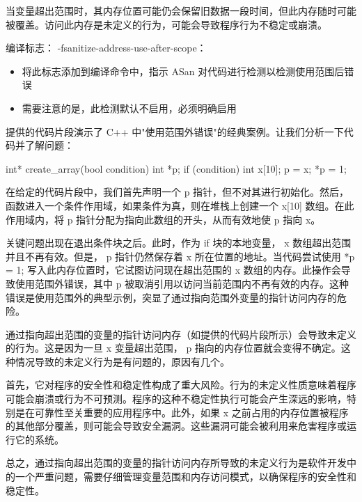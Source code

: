 当变量超出范围时，其内存位置可能仍会保留旧数据一段时间，但此内存随时可能被覆盖。访问此内存是未定义的行为，可能会导致程序行为不稳定或崩溃。


编译标志： -fsanitize-address-use-after-scope：

\begin{itemize}
\item
将此标志添加到编译命令中，指示 ASan 对代码进行检测以检测使用范围后错误

\item
需要注意的是，此检测默认不启用，必须明确启用
\end{itemize}


提供的代码片段演示了 C++ 中"使用范围外错误"的经典案例。让我们分析一下代码并了解问题：

\begin{cpp}
int* create_array(bool condition) {
    int *p;
    if (condition) {
        int x[10];
        p = x;
    }
    *p = 1;
}
\end{cpp}

在给定的代码片段中，我们首先声明一个 p 指针，但不对其进行初始化。然后，函数进入一个条件作用域，如果条件为真，则在堆栈上创建一个 x[10] 数组。在此作用域内，将 p 指针分配为指向此数组的开头，从而有效地使 p 指向 x。

关键问题出现在退出条件块之后。此时，作为 if 块的本地变量， x 数组超出范围并且不再有效。但是， p 指针仍然保存着 x 所在位置的地址。当代码尝试使用 *p = 1; 写入此内存位置时，它试图访问现在超出范围的 x 数组的内存。此操作会导致使用范围外错误，其中 p 被取消引用以访问当前范围内不再有效的内存。这种错误是使用范围外的典型示例，突显了通过指向范围外变量的指针访问内存的危险。

通过指向超出范围的变量的指针访问内存（如提供的代码片段所示）会导致未定义的行为。这是因为一旦 x 变量超出范围， p 指向的内存位置就会变得不确定。这种情况导致的未定义行为是有问题的，原因有几个。

首先，它对程序的安全性和稳定性构成了重大风险。行为的未定义性质意味着程序可能会崩溃或行为不可预测。程序的这种不稳定性执行可能会产生深远的影响，特别是在可靠性至关重要的应用程序中。此外，如果 x 之前占用的内存位置被程序的其他部分覆盖，则可能会导致安全漏洞。这些漏洞可能会被利用来危害程序或运行它的系统。

总之，通过指向超出范围的变量的指针访问内存所导致的未定义行为是软件开发中的一个严重问题，需要仔细管理变量范围和内存访问模式，以确保程序的安全性和稳定性。

